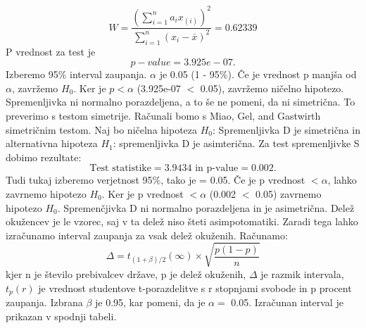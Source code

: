 \documentclass[a4paper,11pt]{article}
\begin{document}
\[W = \frac{(\sum_{i = 1}^{n}a_i x_{(i)})^2}{\sum_{i = 1}^{n}(x_i - \overset{\_}{x})^2} = 0.62339\]
 P vrednost za test je 
\[ p-value = 3.925e-07. \]
Izberemo 95\% interval zaupanja. \(\alpha\) je 0.05 (1 - 95\%). Če je vrednost p manjša od \(\alpha\), zavržemo \(H_0\). Ker je \(p < \alpha\) (3.925e-07 \(<\) 0.05), zavržemo ničelno hipotezo. Spremenljivka ni normalno porazdeljena, a to še ne pomeni, da ni simetrična. To preverimo s testom simetrije. Računali bomo s Miao, Gel, and Gastwirth simetričnim testom. Naj bo ničelna hipoteza \(H_0\): Spremenljivka D je simetrična in alternativna hipoteza \(H_1\): spremenljivka D je asimterična. Za test spremenljivke S dobimo rezultate:
\[\text{Test statistike} = 3.9434 \text{ in p-value} =  0.002.\]
Tudi tukaj izberemo verjetnost 95\%, tako je \alpha = 0.05. Če je p vrednost \(< \alpha\), lahko zavrnemo hipotezo \(H_0\). Ker je p vrednost \(< \alpha\) (0.002 \(<\) 0.05) zavrnemo hipotezo \(H_0\). Spremenčjivka D ni normalno porazdeljena in je asimetrična. Delež okužencev je le vzorec, saj v ta delež niso šteti asimpotomatiki. Zaradi tega lahko izračunamo interval zaupanja za vsak delež okuženih. Računamo:
\[\Delta = t_{(1 + \beta) /2}(\infty) \times \sqrt{\frac{p(1 - p)}{n}}\]
kjer n je število prebivalcev države, p je delež okuženih, \(\Delta\) je razmik intervala, \(t_{p}(r)\) je vrednost studentove t-porazdelitve s r stopnjami svobode in p procent zaupanja. Izbrana \(\beta\) je 0.95, kar pomeni, da je \(\alpha = \) 0.05. Izračunan interval je prikazan v spodnji tabeli. \\
\end{document}
